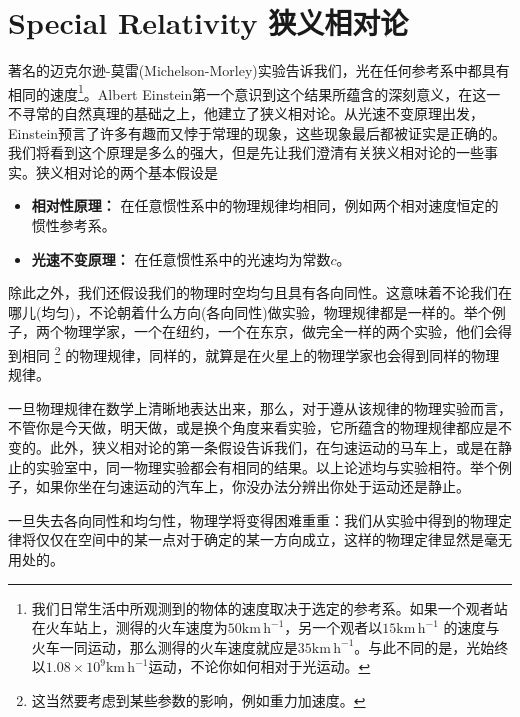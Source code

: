 


\chapter[狭义相对论]{Special Relativity 狭义相对论}
\label{chap2}
 著名的迈克尔逊-莫雷(Michelson-Morley)实验告诉我们，光在任何参考系中都具有相同的速度\footnote{我们日常生活中所观测到的物体的速度取决于选定的参考系。如果一个观者站在火车站上，测得的火车速度为$50 \mathrm{km\,h^{-1}} $，另一个观者以$15\mathrm{km\,h^{-1}}$ 的速度与火车一同运动，那么测得的火车速度就应是$35 \mathrm{km\,h^{-1}}$。与此不同的是，光始终以$1.08 \times 10^9 \mathrm{km\,h^{-1}}$运动，不论你如何相对于光运动。}。Albert Einstein第一个意识到这个结果所蕴含的深刻意义，在这一不寻常的自然真理的基础之上，他建立了狭义相对论。从光速不变原理出发，Einstein预言了许多有趣而又悖于常理的现象，这些现象最后都被证实是正确的。我们将看到这个原理是多么的强大，但是先让我们澄清有关狭义相对论的一些事实。狭义相对论的两个基本假设是
 \begin{itemize}
   \item {\bf{相对性原理：}} 在任意惯性系中的物理规律均相同，例如两个相对速度恒定的惯性参考系。
   \item {\bf{光速不变原理：}} 在任意惯性系中的光速均为常数$c$。
 \end{itemize}
除此之外，我们还假设我们的物理时空均匀且具有各向同性。这意味着不论我们在哪儿(均匀)，不论朝着什么方向(各向同性)做实验，物理规律都是一样的。举个例子，两个物理学家，一个在纽约，一个在东京，做完全一样的两个实验，他们会得到相同
\footnote{这当然要考虑到某些参数的影响，例如重力加速度。}  的物理规律，同样的，就算是在火星上的物理学家也会得到同样的物理规律。

一旦物理规律在数学上清晰地表达出来，那么，对于遵从该规律的物理实验而言，不管你是今天做，明天做，或是换个角度来看实验，它所蕴含的物理规律都应是不变的。此外，狭义相对论的第一条假设告诉我们，在匀速运动的马车上，或是在静止的实验室中，同一物理实验都会有相同的结果。以上论述均与实验相符。举个例子，如果你坐在匀速运动的汽车上，你没办法分辨出你处于运动还是静止。

一旦失去各向同性和均匀性，物理学将变得困难重重：我们从实验中得到的物理定律将仅仅在空间中的某一点对于确定的某一方向成立，这样的物理定律显然是毫无用处的。

